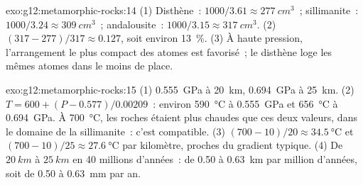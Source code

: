 \begin{solution}{exo:g12:metamorphic-rocks:14}
(1) Disthène~: $1000/3.61 \approx \qty{277}{cm^3}$~; sillimanite~: $1000/3.24
\approx \qty{309}{cm^3}$~; andalousite~: $1000/3.15 \approx \qty{317}{cm^3}$.
(2) $(317 - 277)/317 \approx 0.127$, soit environ \qty{13}{\percent}.
(3) À haute pression, l'arrangement le plus compact des atomes est
favorisé~; le disthène loge les mêmes atomes dans le moins de place.
\end{solution}

\begin{solution}{exo:g12:metamorphic-rocks:15}
(1) \qty{0.555}{GPa} à \qty{20}{km}, \qty{0.694}{GPa} à \qty{25}{km}.
(2) $T = 600 + (P - 0.577)/0.00209$~: environ \qty{590}{\celsius} à
\qty{0.555}{GPa} et \qty{656}{\celsius} à \qty{0.694}{GPa}. À
\qty{700}{\celsius}, les roches étaient plus chaudes que ces deux valeurs,
dans le domaine de la sillimanite~: c'est compatible. (3) $(700 - 10)/20 \approx \qty{34.5}{\celsius}$
et $(700 - 10)/25 \approx \qty{27.6}{\celsius}$ par kilomètre, proches du
gradient typique. (4) De $\qty{20}{km}$ à $\qty{25}{km}$ en 40 millions
d'années~: de 0.50 à \qty{0.63}{km} par million d'années, soit de 0.50 à
\qty{0.63}{mm} par an.
\end{solution}

